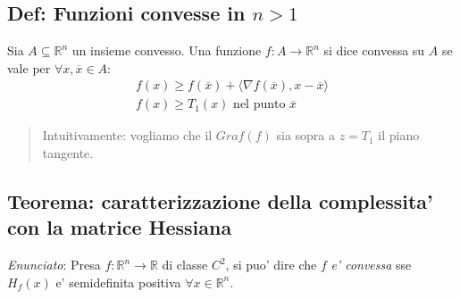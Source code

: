 \documentclass{article}
\begin{document}
\subsection{Def: Funzioni convesse in $n>1$}

Sia $A \subseteq \mathbb{R}^n$ un insieme convesso. Una funzione $f: A \to \mathbb{R}^n$
si dice convessa su $A$ se vale per $\forall x, \overline{x} \in A$:
\begin{align*}
  f(x) \geq f(\overline{x}) + \langle \nabla f(\overline{x}), x - \overline{x} \rangle \\
  f(x) \geq T_1(x) \text{ nel punto } \overline{x}
\end{align*}

\begin{quote}
  Intuitivamente: vogliamo che il $Graf(f)$ sia sopra a $z = T_1$ il piano tangente.
\end{quote}

\subsection{Teorema: caratterizzazione della complessita' con la matrice Hessiana}

\emph{Enunciato}: Presa $f: \mathbb{R}^n \to \mathbb{R}$ di classe $C^2$, si puo'
dire che $f$ \emph{e' convessa} sse $H_f(x)$ e' semidefinita positiva $\forall x \in \mathbb{R}^n$. \\
\end{document}
